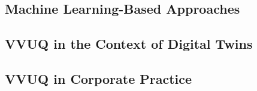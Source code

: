 \subsection{Machine Learning-Based Approaches}
\label{sec:ml-approaches}

\subsection{VVUQ in the Context of Digital Twins}
\label{sec:vvuq-dt}

\subsection{VVUQ in Corporate Practice}
\label{sec:vvuq-corporate-practice}



